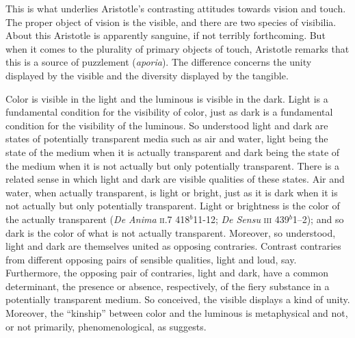 This is what underlies Aristotle's contrasting attitudes towards vision and touch. The proper object of vision is the visible, and there are two species of visibilia. About this Aristotle is apparently sanguine, if not terribly forthcoming. But when it comes to the plurality of primary objects of touch, Aristotle remarks that this is a source of puzzlement (\emph{aporia}). The difference concerns the unity displayed by the visible and the diversity displayed by the tangible. 

Color is visible in the light and the luminous is visible in the dark. Light is a fundamental condition for the visibility of color, just as dark is a fundamental condition for the visibility of the luminous. So understood light and dark are states of potentially transparent media such as air and water, light being the state of the medium when it is actually transparent and dark being the state of the medium when it is not actually but only potentially transparent. There is a related sense in which light and dark are visible qualities of these states. Air and water, when actually transparent, is light or bright, just as it is dark when it is not actually but only potentially transparent. Light or brightness is the color of the actually transparent (\emph{De Anima} \textsc{ii}.7 418\( ^{b} \)11-12; \emph{De Sensu} \textsc{iii} 439\( ^{b} \)1--2); and so dark is the color of what is not actually transparent. Moreover, so understood, light and dark are themselves united as opposing contraries. Contrast contraries from different opposing pairs of sensible qualities, light and loud, say. Furthermore, the opposing pair of contraries, light and dark, have a common determinant, the presence or absence, respectively, of the fiery substance in a potentially transparent medium. So conceived, the visible displays a kind of unity. Moreover, the ``kinship'' between color and the luminous is metaphysical and not, or not primarily, phenomenological, as \citet[63]{Sorabji:1971fr} suggests.

